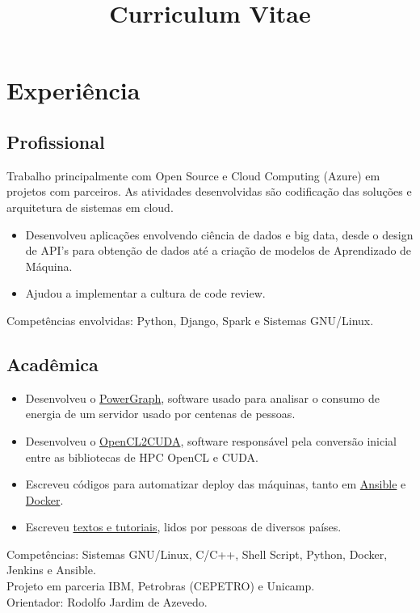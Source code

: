 \documentclass[10pt, a4paper, roman]{moderncv} %
\title{Curriculum Vitae}
\begin{document}
\makecvtitle %

\section{Experiência}

\subsection{Profissional}

{
Trabalho principalmente com Open Source e Cloud Computing (Azure) em projetos com parceiros. As atividades desenvolvidas são
codificação das soluções e arquitetura de sistemas em cloud.
}

{
    \begin{itemize}
        \item Desenvolveu aplicações envolvendo ciência de dados e big data, desde o design de API's para obtenção de dados até a criação de modelos de Aprendizado de Máquina.
        \item Ajudou a implementar a cultura de code review.
    \end{itemize}
    Competências envolvidas: Python, Django, Spark e Sistemas GNU/Linux.
}

\subsection{Acadêmica}
{
    \begin{itemize}
        \item Desenvolveu o \href{https://github.com/Guilhermeslucas/powergraph}{PowerGraph}, software usado para analisar o consumo de energia de um servidor usado por centenas de pessoas.
        \item Desenvolveu o \href{https://github.com/Guilhermeslucas/OpenCL2CUDA}{OpenCL2CUDA}, software responsável pela conversão inicial entre as bibliotecas de HPC OpenCL e CUDA.
        \item Escreveu códigos para automatizar deploy das máquinas, tanto em \href{https://github.com/Guilhermeslucas/Ansible-Code}{Ansible} e 
            \href{https://github.com/Guilhermeslucas/Dockerfiles}{Docker}.
        \item Escreveu \href{http://openpower.ic.unicamp.br/blog/}{textos e tutoriais}, lidos por pessoas de diversos países. 
    \end{itemize}
    Competências: Sistemas GNU/Linux, C/C++, Shell Script, Python, Docker, Jenkins e Ansible.\\ 
    Projeto em parceria IBM, Petrobras (CEPETRO) e Unicamp.\\
    Orientador: Rodolfo Jardim de Azevedo.
}
\end{document}
